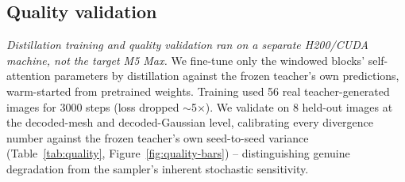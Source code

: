 \documentclass{article}
\begin{document}
\subsection{Quality validation}
\label{sec:quality-validation}
\emph{Distillation training and quality validation ran on a separate H200/CUDA machine, not the
target M5 Max.} We fine-tune only the windowed blocks' self-attention parameters by distillation
against the frozen teacher's own predictions, warm-started from pretrained weights. Training used
56 real teacher-generated images for 3000 steps (loss dropped $\sim$5$\times$). We validate on 8
held-out images at the decoded-mesh and decoded-Gaussian level, calibrating every divergence number
against the frozen teacher's own seed-to-seed variance (Table~\ref{tab:quality},
Figure~\ref{fig:quality-bars}) -- distinguishing genuine degradation from the sampler's inherent
stochastic sensitivity.

\begin{table}[t]
    \centering
    \caption{Distilled-student divergence, calibrated against seed-variance baseline. Below
    1.0$\times$: smaller than the teacher's own natural variation.}
    \label{tab:quality}
\end{table}
\end{document}
